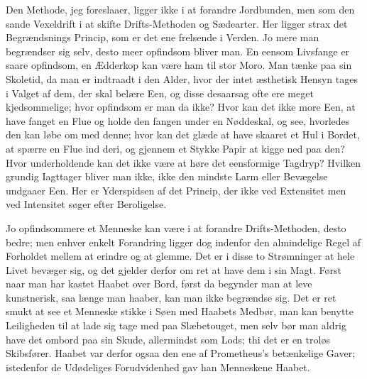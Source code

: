 \documentclass[12pt,a4paper]{article}
\begin{document}
Den Methode, jeg foreslaaer, ligger ikke i at forandre Jordbunden, men som den sande Vexeldrift i at skifte Drifts-Methoden og Sædearter. Her ligger strax det Begrændsnings Princip, som er det ene frelsende i Verden. Jo mere man begrændser sig selv, desto meer opfindsom bliver man. En eensom Livsfange er saare opfindsom, en Ædderkop kan være ham til stor Moro. Man tænke paa sin Skoletid, da man er indtraadt i den Alder, hvor der intet æsthetisk Hensyn tages i Valget af dem, der skal belære Een, og disse desaarsag ofte ere meget kjedsommelige; hvor opfindsom er man da ikke? Hvor kan det ikke more Een, at have fanget en Flue og holde den fangen under en Nøddeskal, og see, hvorledes den kan løbe om med denne; hvor kan det glæde at have skaaret et Hul i Bordet, at spærre en Flue ind deri, og gjennem et Stykke Papir at kigge ned paa den? Hvor underholdende kan det ikke være at høre det eensformige Tagdryp? Hvilken grundig Iagttager bliver man ikke, ikke den mindste Larm eller Bevægelse undgaaer Een. Her er Yderspidsen af det Princip, der ikke ved Extensitet men ved Intensitet søger efter Beroligelse.

Jo opfindsommere et Menneske kan være i at forandre Drifts-Methoden, desto bedre; men enhver enkelt Forandring ligger dog indenfor den almindelige Regel af Forholdet mellem at erindre og at glemme. Det er i disse to Strømninger at hele Livet bevæger sig, og det gjelder derfor om ret at have dem i sin Magt. Først naar man har kastet Haabet over Bord, først da begynder man at leve kunstnerisk, saa længe man haaber, kan man ikke begrændse sig. Det er ret smukt at see et Menneske stikke i Søen med Haabets Medbør, man kan benytte Leiligheden til at lade sig tage med paa Slæbetouget, men selv bør man aldrig have det ombord paa sin Skude, allermindst som Lods; thi det er en troløs Skibsfører. Haabet var derfor ogsaa den ene af Prometheus's betænkelige Gaver; istedenfor de Udødeliges Forudvidenhed gav han Menneskene Haabet.
\end{document}
